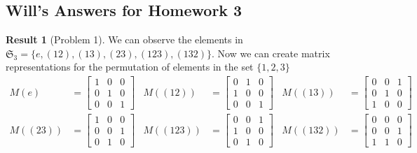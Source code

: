 \documentclass[titlepage]{article}
\theoremstyle{plain}
\theoremstyle{definition}
\newtheorem{result}{Result}[section]
\theoremstyle{remark}
\theoremstyle{exercise-style}
\numberwithin{equation}{section}
\numberwithin{theorem}{section}
\numberwithin{remark}{section}
\begin{document}
\subsection{Will's Answers for Homework 3}

\begin{result}[Problem 1]
    We can observe the elements in $\mathfrak{S}_3 =\{ e, (12), (13), (23), (123), (132) \}$. Now we can create matrix representations for the permutation of elements in the set $\{ 1,2,3 \}$
    \begin{align*}
        M(e) &= 
        \left [ 
        \begin{array}{ccc}
            1 & 0 & 0 \\
            0 & 1 & 0 \\
            0 & 0 & 1
        \end{array} 
        \right ] &
        M((12)) &=
        \left [
        \begin{array}{ccc}
            0 & 1 & 0 \\
            1 & 0 & 0 \\
            0 & 0 & 1
        \end{array}
        \right ] &
        M((13)) &=
        \left [
        \begin{array}{ccc}
            0 & 0 & 1 \\
            0 & 1 & 0 \\
            1 & 0 & 0
        \end{array}
        \right ] \\
        M((23)) &=
        \left [
        \begin{array}{ccc}
            1 & 0 & 0 \\
            0 & 0 & 1 \\
            0 & 1 & 0
        \end{array}
        \right ] &
        M((123)) &=
        \left [
        \begin{array}{ccc}
            0 & 0 & 1 \\
            1 & 0 & 0 \\
            0 & 1 & 0
        \end{array}
        \right ] &
        M((132)) &=
        \left [
        \begin{array}{ccc}
            0 & 0 & 0 \\
            0 & 0 & 1 \\
            1 & 1 & 0
        \end{array}
        \right ]
    \end{align*}
\end{result}
\end{document}

